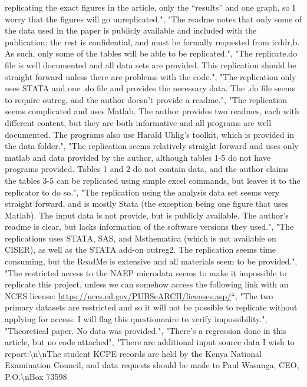 \documentclass[]{article}
\begin{document}
\begin{itemize}
  replicating the exact figures in the article, only the ``results'' and
  one graph, so I worry that the figures will go unreplicated.", "The
  readme notes that only some of the data used in the paper is publicly
  available and included with the publication; the rest is confidential,
  and must be formally requested from icddr,b. As such, only some of the
  tables will be able to be replicated.", "The replicate.do file is well
  documented and all data sets are provided. This replication should be
  straight forward unless there are problems with the code.", "The
  replication only uses STATA and one .do file and provides the
  necessary data. The .do file seems to require outreg, and the author
  doesn't provide a readme.", "The replication seems complicated and
  uses Matlab. The author provides two readmes, each with different
  content, but they are both informative and all programs are well
  documented. The programs also use Harald Uhlig's toolkit, which is
  provided in the data folder.", "The replication seems relatively
  straight forward and uses only matlab and data provided by the author,
  although tables 1-5 do not have programs provided. Tables 1 and 2 do
  not contain data, and the author claims the tables 3-5 can be
  replicated using simple excel commands, but leaves it to the
  replicator to do so.", "The replication using the analysis data set
  seems very straight forward, and is mostly Stata (the exception being
  one figure that uses Matlab). The input data is not provide, but is
  publicly available. The author's readme is clear, but lacks
  information of the software versions they used.", "The replications
  uses STATA, SAS, and Msthematica (which is not available on CISER), as
  well as the STATA add-on outreg2. The replication seems time
  consuming, but the ReadMe is extensive and all materials seem to be
  provided.", "The restricted access to the NAEP microdata seems to make
  it impossible to replicate this project, unless we can somehow access
  the following link with an NCES license:
  \url{https://nces.ed.gov/PUBSeARCH/licenses.asp/}``, "The two primary
  datasets are restricted and so it will not be possible to replicate
  without applying for access. I will flag this questionnaire to verify
  impossibility.", "Theoretical paper. No data was provided.", "There's
  a regression done in this article, but no code attached", "There are
  additional input source data I wish to
  report:\textbackslash{}n\textbackslash{}nThe student KCPE records are
  held by the Kenya National Examination Council, and data requests
  should be made to Paul Wasanga, CEO, P.O.\textbackslash{}nBox 73598

\end{itemize}
\end{document}
